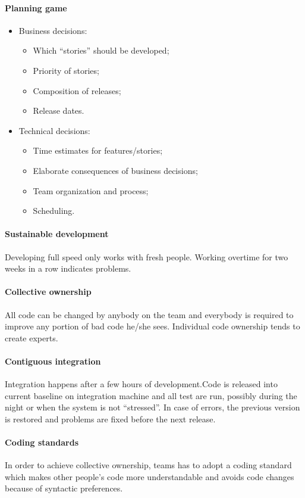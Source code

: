\paragraph{Planning game}
\begin{itemize}
\item Business decisions:
\begin{itemize}
\item Which ``stories'' should be developed;
\item Priority of stories;
\item Composition of releases;
\item Release dates. 
\end{itemize}
\item Technical decisions:
\begin{itemize}
\item Time estimates for features/stories;
\item Elaborate consequences of business decisions;
\item Team organization and process;
\item Scheduling.
\end{itemize}
\end{itemize}

\paragraph{Sustainable development}
Developing full speed only works with fresh people. Working overtime for two weeks in a row indicates problems.

\paragraph{Collective ownership}
All code can be changed by anybody on the team and everybody is required to improve any portion of bad code he/she sees. Individual code ownership tends to create experts.

\paragraph{Contiguous integration}
Integration happens after a few hours of development.Code is released into current baseline on integration machine and all test are run, possibly during the night or when the system is not ``stressed''. In case of errors, the previous version is restored and problems are fixed before the next release.

\paragraph{Coding standards}
In order to achieve collective ownership, teams has to adopt a coding standard which makes other people's code more understandable and avoids code changes because of syntactic preferences.

